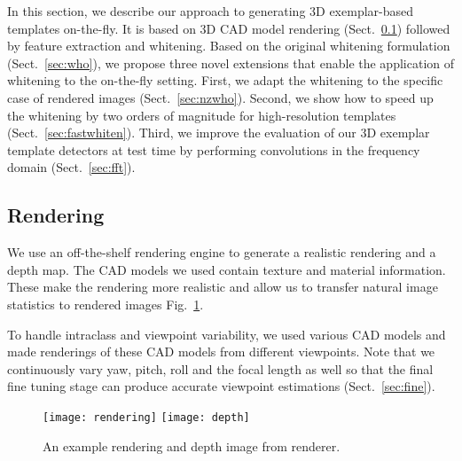In this section, we describe our approach to generating 3D
exemplar-based templates on-the-fly. It is based on 3D CAD model
rendering (Sect.~\ref{sec:rendering}) followed by feature extraction
and whitening. Based on the original whitening
formulation (Sect.~\ref{sec:who}), we propose three novel extensions that
enable the application of whitening to the on-the-fly setting.
%
First, we adapt the whitening to the specific case of rendered
images (Sect.~\ref{sec:nzwho}). Second, we show how to speed up the
whitening by two orders of magnitude for high-resolution templates
(Sect.~\ref{sec:fastwhiten}). Third, we improve the evaluation of our
3D exemplar template detectors at test time by performing
convolutions in the frequency domain (Sect.~\ref{sec:fft}).


\subsection{Rendering}
\label{sec:rendering}

We use an off-the-shelf rendering engine to generate a realistic rendering
and a depth map. The CAD models we used contain texture and material
information. These make the rendering more realistic and allow us to transfer
natural image statistics to rendered images Fig.~\ref{fig:rendering}.

To handle intraclass and viewpoint variability, we used various CAD models and
made renderings of these CAD models from different viewpoints. Note that we
continuously vary yaw, pitch, roll and the focal length as well so that the
final fine tuning stage can produce accurate viewpoint estimations
(Sect.~\ref{sec:fine}).

\begin{figure}[t]
  \begin{center}
    \texttt{[image: rendering]}
    \texttt{[image: depth]}
  \end{center}
  \caption{An example rendering and depth image from renderer.}
  \label{fig:rendering}
\end{figure}


